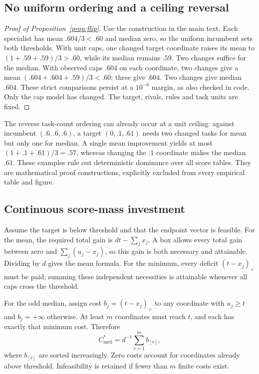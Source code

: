 \documentclass{article}
\newcommand{\med}{\mathrm{med}}
\begin{document}
\subsection{No uniform ordering and a ceiling reversal}
\begin{proof}[Proof of Proposition~\ref{prop:flip}]
Use the construction in the main text. Each specialist has mean $.604/3<.60$
and median zero, so the uniform incumbent sets both thresholds. With unit caps,
one changed target coordinate raises its mean to $(1+.59+.59)/3>.60$, while its
median remains $.59$. Two changes suffice for the median. With observed caps
$.604$ on each coordinate, two changes give a mean
$(.604+.604+.59)/3<.60$; three give $.604$. Two changes give median $.604$.
These strict comparisons persist at a $10^{-6}$ margin, as also checked in code.
Only the cap model has changed. The target, rivals, rules and task units are fixed.
\end{proof}

The reverse task-count ordering can already occur at a unit ceiling: against
incumbent $(.6,.6,.6)$, a target $(0,.1,.61)$ needs two changed tasks for mean but
only one for median. A single mean improvement yields at most $(1+.1+.61)/3=.57$,
whereas changing the $.1$ coordinate makes the median $.61$. These examples rule
out deterministic dominance over all score tables. They are mathematical proof
constructions, explicitly excluded from every empirical table and figure.

\subsection{Continuous score-mass investment}
\label{app:mass}
Assume the target is below threshold and that the endpoint vector is feasible.
For the mean, the required total gain is $dt-\sum_jx_j$. A box allows every total
gain between zero and $\sum_j(u_j-x_j)$, so this gain is both necessary and
attainable. Dividing by $d$ gives the mean formula. For the minimum, every
deficit $(t-x_j)_+$ must be paid; summing these independent necessities is
attainable whenever all caps cross the threshold.

For the odd median, assign cost $b_j=(t-x_j)_+$ to any coordinate with $u_j\ge t$
and $b_j=+\infty$ otherwise. At least $m$ coordinates must reach $t$, and each
has exactly that minimum cost. Therefore
\begin{equation}
 C^*_\med=d^{-1}\sum_{r=1}^{m}b_{[r]},
\end{equation}
where $b_{[r]}$ are sorted increasingly. Zero costs account for coordinates
already above threshold. Infeasibility is retained if fewer than $m$ finite
costs exist.
\end{document}
